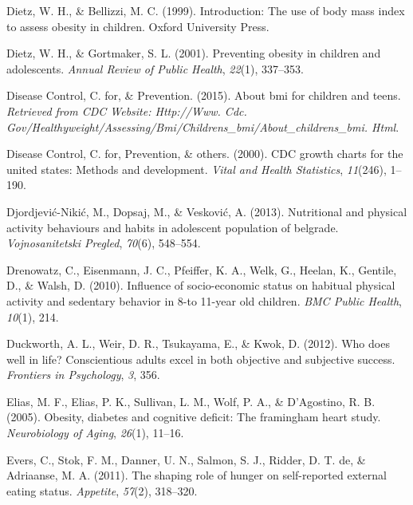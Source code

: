 \documentclass[man]{apa6}
\begin{document}
\leavevmode\hypertarget{ref-dietz1999introduction}{}%
Dietz, W. H., \& Bellizzi, M. C. (1999). Introduction: The use of body mass index to assess obesity in children. Oxford University Press.

\leavevmode\hypertarget{ref-dietz2001preventing}{}%
Dietz, W. H., \& Gortmaker, S. L. (2001). Preventing obesity in children and adolescents. \emph{Annual Review of Public Health}, \emph{22}(1), 337--353.

\leavevmode\hypertarget{ref-centers2015bmi}{}%
Disease Control, C. for, \& Prevention. (2015). About bmi for children and teens. \emph{Retrieved from CDC Website: Http://Www. Cdc. Gov/Healthyweight/Assessing/Bmi/Childrens\_bmi/About\_childrens\_bmi. Html}.

\leavevmode\hypertarget{ref-centers2000cdc}{}%
Disease Control, C. for, Prevention, \& others. (2000). CDC growth charts for the united states: Methods and development. \emph{Vital and Health Statistics}, \emph{11}(246), 1--190.

\leavevmode\hypertarget{ref-djordjevic2013nutritional}{}%
Djordjević-Nikić, M., Dopsaj, M., \& Vesković, A. (2013). Nutritional and physical activity behaviours and habits in adolescent population of belgrade. \emph{Vojnosanitetski Pregled}, \emph{70}(6), 548--554.

\leavevmode\hypertarget{ref-drenowatz2010influence}{}%
Drenowatz, C., Eisenmann, J. C., Pfeiffer, K. A., Welk, G., Heelan, K., Gentile, D., \& Walsh, D. (2010). Influence of socio-economic status on habitual physical activity and sedentary behavior in 8-to 11-year old children. \emph{BMC Public Health}, \emph{10}(1), 214.

\leavevmode\hypertarget{ref-duckworth2012does}{}%
Duckworth, A. L., Weir, D. R., Tsukayama, E., \& Kwok, D. (2012). Who does well in life? Conscientious adults excel in both objective and subjective success. \emph{Frontiers in Psychology}, \emph{3}, 356.

\leavevmode\hypertarget{ref-elias2005obesity}{}%
Elias, M. F., Elias, P. K., Sullivan, L. M., Wolf, P. A., \& D'Agostino, R. B. (2005). Obesity, diabetes and cognitive deficit: The framingham heart study. \emph{Neurobiology of Aging}, \emph{26}(1), 11--16.

\leavevmode\hypertarget{ref-evers2011shaping}{}%
Evers, C., Stok, F. M., Danner, U. N., Salmon, S. J., Ridder, D. T. de, \& Adriaanse, M. A. (2011). The shaping role of hunger on self-reported external eating status. \emph{Appetite}, \emph{57}(2), 318--320.
\end{document}
